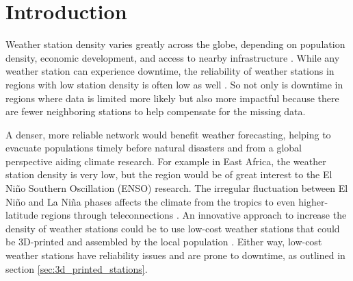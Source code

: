\section{Introduction}
\label{sec:introduction}


Weather station density varies greatly across the globe, depending on population density, economic development, and access to nearby infrastructure \cite{ortizbobea2021}. While any weather station can experience downtime, the reliability of weather stations in regions with low station density is often low as well \cite{Mistry2022GlobalWeatherStations}. So not only is downtime in regions where data is limited more likely but also more impactful because there are fewer neighboring stations to help compensate for the missing data.

A denser, more reliable network would benefit weather forecasting, helping to evacuate populations timely before natural disasters \cite{muita2021} and from a global perspective aiding climate research. For example in East Africa, the weather station density is very low, but the region would be of great interest to the El Niño Southern Oscillation (ENSO) research. The irregular fluctuation between El Niño and La Niña phases affects the climate from the tropics to even higher-latitude regions through teleconnections \cite{marchant2007, muita2021}.  An innovative approach to increase the density of weather stations could be to use low-cost weather stations that could be 3D-printed and assembled by the local population \cite{muita2021}. Either way, low-cost weather stations have reliability issues and are prone to downtime, as outlined in section \ref{sec:3d_printed_stations}.


